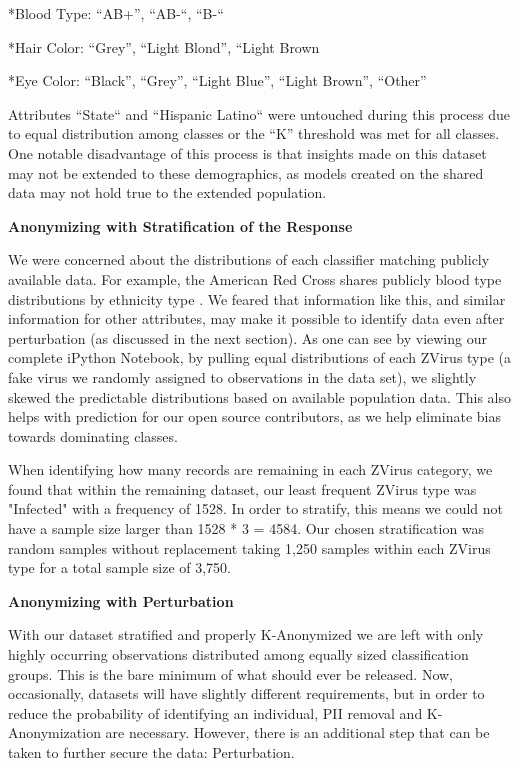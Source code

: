 \documentclass[10pt,journal,compsoc]{IEEEtran}
\begin{document}
		*Blood Type: “AB+”, “AB-“, “B-“ 
		
		*Hair Color: “Grey”, “Light Blond”, “Light Brown
		
		*Eye Color: “Black”, “Grey”, “Light Blue”, “Light Brown”, “Other”

Attributes ``State`` and ``Hispanic Latino`` were untouched during this process due to equal distribution among classes or the “K” threshold was met for all classes.  One notable disadvantage of this process is that insights made on this dataset may not be extended to these demographics, as models created on the shared data may not hold true to the extended population.\linebreak

\noindent \textbf{ Anonymizing with Stratification of the Response}

We were concerned about the distributions of each classifier matching publicly available data. For example, the American Red Cross shares publicly blood type distributions by ethnicity type . We feared that information like this, and similar information for other attributes, may make it possible to identify data even after perturbation (as discussed in the next section). As one can see by viewing our complete iPython Notebook, by pulling equal distributions of each ZVirus type (a fake virus we randomly assigned to observations in the data set), we slightly skewed the predictable distributions based on available population data. This also helps with prediction for our open source contributors, as we help eliminate bias towards dominating classes.

When identifying how many records are remaining in each ZVirus category, we found that within the remaining dataset, our least frequent ZVirus type was "Infected" with a frequency of 1528. In order to stratify, this means we could not have a sample size larger than 1528 * 3 = 4584. Our chosen stratification was random samples without replacement taking 1,250 samples within each ZVirus type for a total sample size of 3,750.\linebreak

\noindent \textbf{Anonymizing with Perturbation}

With our dataset stratified and properly K-Anonymized we are left with only highly occurring observations distributed among equally sized classification groups. This is the bare minimum of what should ever be released. Now, occasionally,  datasets will have slightly different requirements, but in order to reduce the probability of identifying an individual, PII removal and K-Anonymization are necessary.  However, there is an additional step that can be taken to further secure the data: Perturbation.
\end{document}
